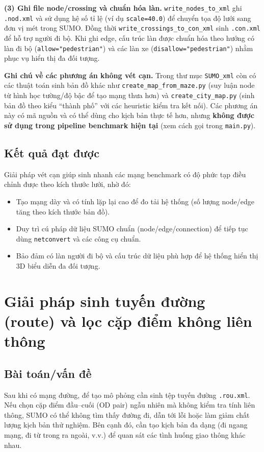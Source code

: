 \documentclass[../DoAn.tex]{subfiles}
\begin{document}
\textbf{(3) Ghi file node/crossing và chuẩn hóa làn.} \texttt{write\_nodes\_to\_xml} ghi \texttt{.nod.xml} và sử dụng hệ số tỉ lệ (ví dụ \texttt{scale=40.0}) để chuyển tọa độ lưới sang đơn vị mét trong SUMO. Đồng thời \texttt{write\_crossings\_to\_con\_xml} sinh \texttt{.con.xml} để hỗ trợ người đi bộ. Khi ghi edge, cấu trúc làn được chuẩn hóa theo hướng có làn đi bộ (\texttt{allow="pedestrian"}) và các làn xe (\texttt{disallow="pedestrian"}) nhằm phục vụ hiển thị đa đối tượng.

\textbf{Ghi chú về các phương án không vét cạn.} Trong thư mục \texttt{SUMO\_xml} còn có các thuật toán sinh bản đồ khác như \texttt{create\_map\_from\_maze.py} (suy luận node từ hình học tường/độ bậc để tạo mạng thưa hơn) và \texttt{create\_city\_map.py} (sinh bản đồ theo kiểu ``thành phố'' với các heuristic kiểm tra kết nối). Các phương án này có mã nguồn và có thể dùng cho kịch bản thực tế hơn, nhưng \textbf{không được sử dụng trong pipeline benchmark hiện tại} (xem cách gọi trong \texttt{main.py}).

\subsection{Kết quả đạt được}
Giải pháp vét cạn giúp sinh nhanh các mạng benchmark có độ phức tạp điều chỉnh được theo kích thước lưới, nhờ đó:
\begin{itemize}[leftmargin=2em]
	\item Tạo mạng dày và có tính lặp lại cao để đo tải hệ thống (số lượng node/edge tăng theo kích thước bản đồ).
	\item Duy trì cú pháp dữ liệu SUMO chuẩn (node/edge/connection) để tiếp tục dùng \texttt{netconvert} và các công cụ chuẩn.
	\item Bảo đảm có làn người đi bộ và cấu trúc dữ liệu phù hợp để hệ thống hiển thị 3D biểu diễn đa đối tượng.
\end{itemize}

\section{Giải pháp sinh tuyến đường (route) và lọc cặp điểm không liên thông}
\subsection{Bài toán/vấn đề}
Sau khi có mạng đường, để tạo mô phỏng cần sinh tệp tuyến đường \texttt{.rou.xml}. Nếu chọn cặp điểm đầu--cuối (OD pair) ngẫu nhiên mà không kiểm tra tính liên thông, SUMO có thể không tìm thấy đường đi, dẫn tới lỗi hoặc làm giảm chất lượng kịch bản thử nghiệm. Bên cạnh đó, cần tạo kịch bản đa dạng (đi ngang mạng, đi từ trong ra ngoài, v.v.) để quan sát các tình huống giao thông khác nhau.
\end{document}
